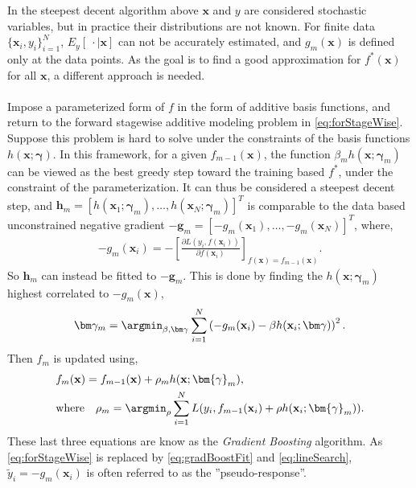 In the steepest decent algorithm above $\mathbf{x}$ and $y$ are considered stochastic variables, but in practice their distributions are not known. For finite data $\{\mathbf{x}_i, y_i\}_{i = 1}^{N}$, $E_y \left[\: \cdot \mid \mathbf{x} \right]$ can not be accurately estimated, and $g_m(\mathbf{x})$ is defined only at the data points. As the goal is to find a good approximation for $f^*(\mathbf{x})$ for all $\mathbf{x}$, a different approach is needed. 
\\
\\
Impose a parameterized form of $f$ in the form of additive basis functions, and return to the forward stagewise additive modeling problem in \eqref{eq:forStageWise}. Suppose this problem is hard to solve under the constraints of the basis functions $h(\mathbf{x}; \bm \gamma)$.
In this framework, for a given $f_{m-1}(\mathbf{x})$, the function $\beta_m h(\mathbf{x}; \bm{\gamma}_m)$ can be viewed as the best greedy step toward the training based $f^*$, under the constraint of the parameterization. It can thus be considered a steepest decent step, and $\mathbf{h}_m = [h(\mathbf{x}_1; \bm\gamma_m), \ldots, h(\mathbf{x}_N; \bm\gamma_m)]^T$ is comparable to the data based unconstrained negative gradient $-\mathbf{g}_m = [-g_m(\mathbf{x}_1), \ldots, -g_m(\mathbf{x}_N)]^T$, where,
\begin{align}
  -g_{m}(\mathbf{x}_i) = -\left[ \frac{\partial L(y_i, f(\mathbf{x}_i)) }{\partial f(\mathbf{x}_i)} \right]_{f(\mathbf{x}) = f_{m-1}(\mathbf{x})}.
\end{align}
So $ \mathbf{h}_m$ can instead be fitted to $-\mathbf{g}_m$. This is done by finding the $h(\mathbf{x}; \bm{\gamma}_m)$ highest correlated to $-g_m(\mathbf{x})$,
\begin{align}
  \label{eq:gradBoostFit} 
  \bm \gamma_m = \argmin_{\beta, \bm \gamma} \sum^{N}_{i=1} \left( -g_m(\mathbf{x}_i) - \beta h(\mathbf{x}_i; \bm \gamma) \right)^2.
\end{align}
Then $f_m$ is updated using,
\begin{align}
  &f_m(\mathbf{x}) = f_{m-1}(\mathbf{x}) + \rho_m h(\mathbf{x}; \bm{\gamma}_{m}),\\
  \label{eq:lineSearch} 
  &\text{where} \quad \rho_m = \argmin_\rho \sum^{N}_{i=1} L(y_i, f_{m-1}(\mathbf{x}_i) + \rho h(\mathbf{x}_i; \bm{\gamma}_m)).
\end{align}
These last three equations are know as the \textit{Gradient Boosting} algorithm.
As \eqref{eq:forStageWise} is replaced by \eqref{eq:gradBoostFit} and \eqref{eq:lineSearch}, $\tilde{y}_i = -g_m(\mathbf{x}_i)$ is often referred to as the ''pseudo-response''. 

